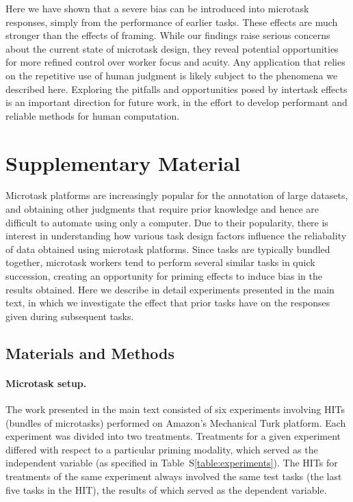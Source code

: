 \documentclass[12pt]{article}
\begin{document}
Here we have shown that a severe bias can be introduced into microtask 
responses, simply from the performance of earlier tasks. 
These effects are much stronger than the effects of framing.  
While our findings raise serious concerns about the 
current state of microtask design, they reveal potential opportunities 
for more 
refined control over worker focus and acuity.  Any application that relies
on the repetitive use of human judgment is likely subject to the phenomena
we described here.  Exploring the pitfalls and opportunities posed by
intertask effects is an important direction for future work, 
in the effort to develop performant and reliable methods for human 
computation.




\pagebreak
\section*{Supplementary Material}
\renewcommand{\figurename}{Figure S\!\!}
\renewcommand{\tablename}{Table S\!\!}
\renewcommand{\theequation}{S\arabic{equation}}
\setcounter{figure}{0}
\setcounter{table}{0}
\setcounter{equation}{0}

Microtask platforms are increasingly popular for the annotation of large
datasets, and obtaining other judgments that require prior knowledge and 
hence are difficult to automate using only a computer.  Due to their 
popularity, there is interest in understanding how various task design factors
influence the reliabality of data obtained using microtask platforms.  
Since tasks are typically bundled together, microtask 
workers tend to perform several similar tasks in quick succession, creating an opportunity for priming effects to induce bias in the results obtained.
Here we describe in detail experiments presented in the main text, in which
we investigate the effect that prior tasks have on the responses given during
subsequent tasks.  

\subsection*{Materials and Methods}

\paragraph{Microtask setup.}

The work presented in the main text consisted of six experiments involving
HITs (bundles of microtasks) performed on Amazon's Mechanical Turk platform.  
Each experiment was divided into two treatments.  Treatments for a given 
experiment differed with respect to a particular priming modality, which 
served as the independent variable
(as specified in Table~S\ref{table:experiments}).  
The HITs for treatments of the same experiment always involved the same
test tasks (the last five tasks in the HIT),
the results of which served as the dependent variable.
\end{document}
